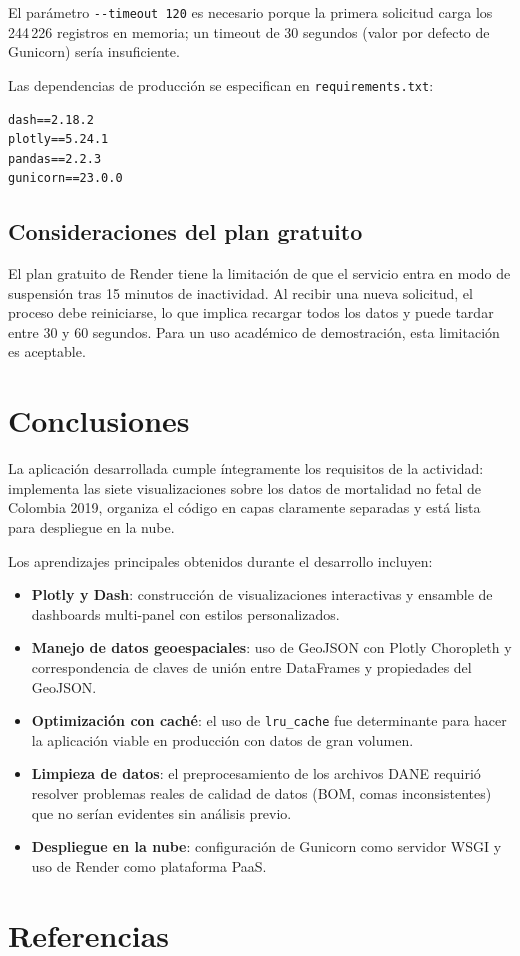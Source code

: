 \documentclass[a4paper,12pt]{report}
\numberwithin{equation}{chapter}
\numberwithin{figure}{chapter}
\numberwithin{table}{chapter}
\begin{document}
El parámetro \texttt{-{}-timeout 120} es necesario porque la primera solicitud carga los 244\,226 registros en memoria; un timeout de 30 segundos (valor por defecto de Gunicorn) sería insuficiente.

Las dependencias de producción se especifican en \texttt{requirements.txt}:

\begin{lstlisting}[language={}, caption={requirements.txt con versiones fijadas}, label={lst:req}]
dash==2.18.2
plotly==5.24.1
pandas==2.2.3
gunicorn==23.0.0
\end{lstlisting}

\section{Consideraciones del plan gratuito}

El plan gratuito de Render tiene la limitación de que el servicio entra en modo de suspensión tras 15 minutos de inactividad. Al recibir una nueva solicitud, el proceso debe reiniciarse, lo que implica recargar todos los datos y puede tardar entre 30 y 60 segundos. Para un uso académico de demostración, esta limitación es aceptable.

\chapter{Conclusiones}\label{chap:conclusiones}

La aplicación desarrollada cumple íntegramente los requisitos de la actividad: implementa las siete visualizaciones sobre los datos de mortalidad no fetal de Colombia 2019, organiza el código en capas claramente separadas y está lista para despliegue en la nube.

Los aprendizajes principales obtenidos durante el desarrollo incluyen:

\begin{itemize}
    \item \textbf{Plotly y Dash}: construcción de visualizaciones interactivas y ensamble de dashboards multi-panel con estilos personalizados.
    \item \textbf{Manejo de datos geoespaciales}: uso de GeoJSON con Plotly Choropleth y correspondencia de claves de unión entre DataFrames y propiedades del GeoJSON.
    \item \textbf{Optimización con caché}: el uso de \texttt{lru\_cache} fue determinante para hacer la aplicación viable en producción con datos de gran volumen.
    \item \textbf{Limpieza de datos}: el preprocesamiento de los archivos DANE requirió resolver problemas reales de calidad de datos (BOM, comas inconsistentes) que no serían evidentes sin análisis previo.
    \item \textbf{Despliegue en la nube}: configuración de Gunicorn como servidor WSGI y uso de Render como plataforma PaaS.
\end{itemize}

\chapter*{Referencias}


\end{document}

